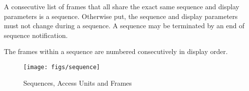 
A consecutive list of frames that all share the exact same sequence and
display parameters is a sequence.  Otherwise put, the sequence and
display parameters must not change during a sequence.  A sequence may be
terminated by an end of sequence notification.

The frames within a sequence are numbered consecutively in display
order.

\begin{figure}
    \centering
    \texttt{[image: figs/sequence]}
    \caption{Sequences, Access Units and Frames}
    \label{fig:sequence}
\end{figure}

